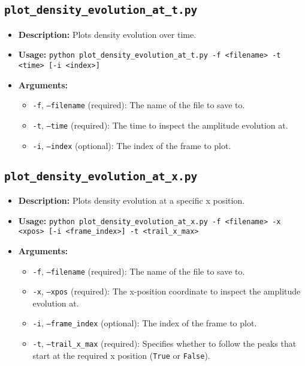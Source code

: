 \documentclass{article}
\begin{document}
\subsection{\texttt{plot\_density\_evolution\_at\_t.py}}
\begin{itemize}
    \item \textbf{Description:} Plots density evolution over time.
    \item \textbf{Usage:} \texttt{python plot\_density\_evolution\_at\_t.py -f <filename> -t <time> [-i <index>]}
    \item \textbf{Arguments:}
    \begin{itemize}
        \item \texttt{-f}, \texttt{--filename} (required): The name of the file to save to.
        \item \texttt{-t}, \texttt{--time} (required): The time to inspect the amplitude evolution at.
        \item \texttt{-i}, \texttt{--index} (optional): The index of the frame to plot.
    \end{itemize}
\end{itemize}

\subsection{\texttt{plot\_density\_evolution\_at\_x.py}}
\begin{itemize}
    \item \textbf{Description:} Plots density evolution at a specific x position.
    \item \textbf{Usage:} \texttt{python plot\_density\_evolution\_at\_x.py -f <filename> -x <xpos> [-i <frame\_index>] -t <trail\_x\_max>}
    \item \textbf{Arguments:}
    \begin{itemize}
        \item \texttt{-f}, \texttt{--filename} (required): The name of the file to save to.
        \item \texttt{-x}, \texttt{--xpos} (required): The x-position coordinate to inspect the amplitude evolution at.
        \item \texttt{-i}, \texttt{--frame\_index} (optional): The index of the frame to plot.
        \item \texttt{-t}, \texttt{--trail\_x\_max} (required): Specifies whether to follow the peaks that start at the required x position (\texttt{True} or \texttt{False}).
    \end{itemize}
\end{itemize}
\end{document}

